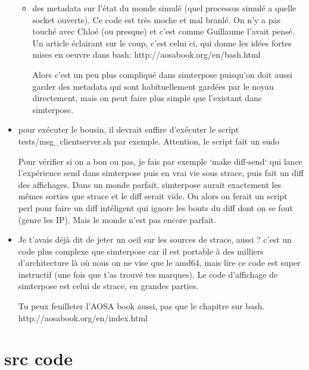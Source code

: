 \documentclass{article}
\begin{document}
\begin{itemize}
\begin{itemize}
  \item des metadata sur l'état du monde simulé (quel processus simulé
    a quelle socket ouverte). Ce code est très moche et mal branlé. On
    n'y a pas touché avec Chloé (ou presque) et c'est comme Guillaume
    l'avait pensé. Un article éclairant sur le coup, c'est celui ci,
    qui donne les idées fortes mises en oeuvre dans bash:
    http://aosabook.org/en/bash.html
    
    Alors c'est un peu plus compliqué dans simterpose puisqu'on doit
    aussi garder des metadata qui sont habituellement gardées par le
    noyau directement, mais on peut faire plus simple que l'existant
    dans simterpose.
\end{itemize}
\item pour exécuter le bousin, il devrait suffire d'exécuter le script
  tests/msg\_clientserver.sh par exemple. Attention, le script fait un
  sudo
  
  Pour vérifier si on a bon ou pas, je fais par exemple `make
  diff-send` qui lance l'expérience send dans simterpose puis en vrai
  vie sous strace, puis fait un diff des affichages. Dans un monde
  parfait, simterpose aurait exactement les mêmes sorties que strace
  et le diff serait vide. Ou alors on ferait un script perl pour faire
  un diff intéligent qui ignore les bouts du diff dont on se fout
  (genre les IP). Mais le monde n'est pas encore parfait.
  
\item Je t'avais déjà dit de jeter un oeil sur les sources de strace,
  aussi ?  c'est un code plus complexe que simterpose car il est
  portable à des milliers d'architecture là où nous on ne vise que le
  amd64, mais lire ce code est super instructif (une fois que t'as
  trouvé tes marques). Le code d'affichage de simterpose est celui de
  strace, en grandes parties.
  
  Tu peux feuilleter l'AOSA book aussi, pas que le chapitre sur bash.
  http://aosabook.org/en/index.html
\end{itemize}

\section{src code}
\end{document}
